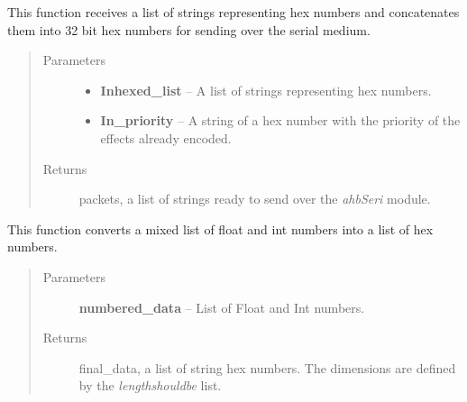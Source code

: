 \documentclass[letterpaper,10pt,english]{sphinxmanual}
\begin{document}

\begin{fulllineitems}
\label{Code:DataStrLeon.hexconcatenator}
This function receives a list of strings representing hex numbers and 
concatenates them into 32 bit hex numbers for sending over the serial medium.
\begin{quote}\begin{description}
\item[{Parameters}] \leavevmode\begin{itemize}
\item {} 
\textbf{Inhexed\_list} -- A list of strings representing hex numbers.

\item {} 
\textbf{In\_priority} -- A string of a hex number with the priority of the effects already encoded.

\end{itemize}

\item[{Returns}] \leavevmode
packets, a list of strings ready to send over the \emph{ahbSeri} module.

\end{description}\end{quote}

\end{fulllineitems}


\begin{fulllineitems}
\label{Code:DataStrLeon.hexizer}
This function converts a mixed list of float and int numbers into a list of hex numbers.
\begin{quote}\begin{description}
\item[{Parameters}] \leavevmode
\textbf{numbered\_data} -- List of Float and Int numbers.

\item[{Returns}] \leavevmode
final\_data, a list of string hex numbers. The dimensions are defined by the \emph{lengthshouldbe} list.

\end{description}\end{quote}

\end{fulllineitems}
\end{document}
